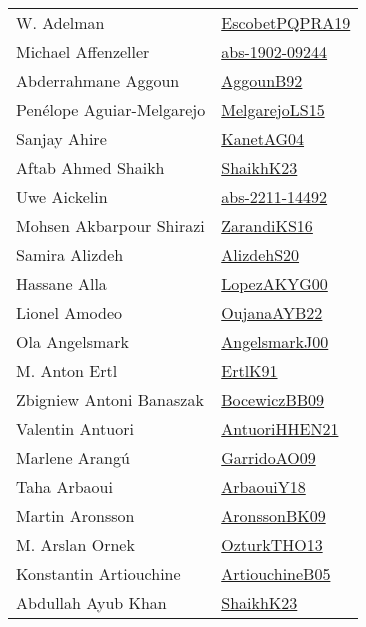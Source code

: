 {\begin{longtable}{p{4cm}p{20cm}}
W. Adelman & \href{articles/EscobetPQPRA19.pdf}{EscobetPQPRA19}\cite{EscobetPQPRA19} \\
Michael Affenzeller & \href{articles/abs-1902-09244.pdf}{abs-1902-09244}\cite{abs-1902-09244} \\
Abderrahmane Aggoun & \href{papers/AggounB92.pdf}{AggounB92}\cite{AggounB92} \\
Pen{\'{e}}lope Aguiar{-}Melgarejo & \href{papers/MelgarejoLS15.pdf}{MelgarejoLS15}\cite{MelgarejoLS15} \\
Sanjay Ahire & \href{}{KanetAG04}\cite{KanetAG04} \\
Aftab Ahmed Shaikh & \href{articles/ShaikhK23.pdf}{ShaikhK23}\cite{ShaikhK23} \\
Uwe Aickelin & \href{articles/abs-2211-14492.pdf}{abs-2211-14492}\cite{abs-2211-14492} \\
Mohsen Akbarpour Shirazi & \href{articles/ZarandiKS16.pdf}{ZarandiKS16}\cite{ZarandiKS16} \\
Samira Alizdeh & \href{articles/AlizdehS20.pdf}{AlizdehS20}\cite{AlizdehS20} \\
Hassane Alla & \href{articles/LopezAKYG00.pdf}{LopezAKYG00}\cite{LopezAKYG00} \\
Lionel Amodeo & \href{papers/OujanaAYB22.pdf}{OujanaAYB22}\cite{OujanaAYB22} \\
Ola Angelsmark & \href{papers/AngelsmarkJ00.pdf}{AngelsmarkJ00}\cite{AngelsmarkJ00} \\
M. Anton Ertl & \href{papers/ErtlK91.pdf}{ErtlK91}\cite{ErtlK91} \\
Zbigniew Antoni Banaszak & \href{articles/BocewiczBB09.pdf}{BocewiczBB09}\cite{BocewiczBB09} \\
Valentin Antuori & \href{papers/AntuoriHHEN21.pdf}{AntuoriHHEN21}\cite{AntuoriHHEN21} \\
Marlene Arang{\'{u}} & \href{articles/GarridoAO09.pdf}{GarridoAO09}\cite{GarridoAO09} \\
Taha Arbaoui & \href{papers/ArbaouiY18.pdf}{ArbaouiY18}\cite{ArbaouiY18} \\
Martin Aronsson & \href{papers/AronssonBK09.pdf}{AronssonBK09}\cite{AronssonBK09} \\
M. Arslan Ornek & \href{articles/OzturkTHO13.pdf}{OzturkTHO13}\cite{OzturkTHO13} \\
Konstantin Artiouchine & \href{papers/ArtiouchineB05.pdf}{ArtiouchineB05}\cite{ArtiouchineB05} \\
Abdullah Ayub Khan & \href{articles/ShaikhK23.pdf}{ShaikhK23}\cite{ShaikhK23} \\

\end{longtable}}
